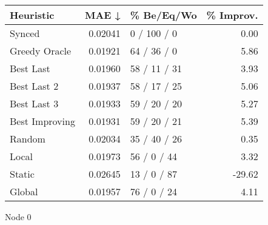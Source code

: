 \begin{tabular}{lrlr}
\toprule
\textbf{Heuristic} & \textbf{MAE ↓} & \textbf{\% Be/Eq/Wo} & \textbf{\% Improv.} \\
\midrule
            Synced &        0.02041 &          0 / 100 / 0 &                0.00 \\
     Greedy Oracle &        0.01921 &          64 / 36 / 0 &                5.86 \\
         Best Last &        0.01960 &         58 / 11 / 31 &                3.93 \\
       Best Last 2 &        0.01937 &         58 / 17 / 25 &                5.06 \\
       Best Last 3 &        0.01933 &         59 / 20 / 20 &                5.27 \\
    Best Improving &        0.01931 &         59 / 20 / 21 &                5.39 \\
            Random &        0.02034 &         35 / 40 / 26 &                0.35 \\
             Local &        0.01973 &          56 / 0 / 44 &                3.32 \\
            Static &        0.02645 &          13 / 0 / 87 &              -29.62 \\
            Global &        0.01957 &          76 / 0 / 24 &                4.11 \\
\bottomrule
\end{tabular}
\caption{Node 0}
\label{tab:iid_lr01_le2_bs4_0}
